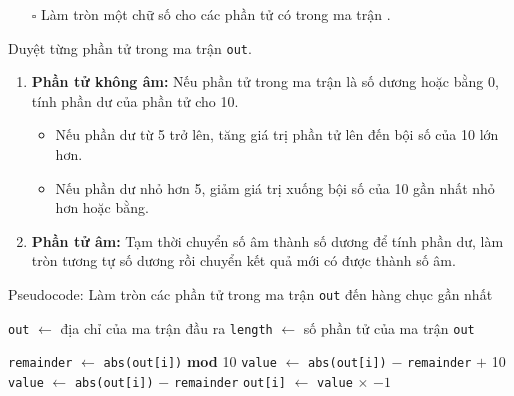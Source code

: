 \documentclass{article}
\begin{document}
\pagebreak
\begin{itemize}
	\item [$\square$] Làm tròn một chữ số cho các phần tử có trong ma trận .
\end{itemize}
\hspace{0.4cm} Duyệt từng phần tử trong ma trận \texttt{out}.
\begin{enumerate}
	\item \textbf{Phần tử không âm:} Nếu phần tử trong ma trận là số dương hoặc bằng 0, tính phần dư của phần tử cho 10.
	\begin{itemize}
		\item Nếu phần dư từ 5 trở lên, tăng giá trị phần tử lên đến bội số của 10 lớn hơn.
		\item Nếu phần dư nhỏ hơn 5, giảm giá trị xuống bội số của 10 gần nhất nhỏ hơn hoặc bằng.
	\end{itemize}
	\item \textbf{Phần tử âm: } Tạm thời chuyển số âm thành số dương để tính phần dư, làm tròn tương tự số dương rồi chuyển kết quả mới có được thành số âm.
\end{enumerate}
\begin{algorithm}
	\caption{Pseudocode: Làm tròn các phần tử trong ma trận \texttt{out} đến hàng chục gần nhất}
	\begin{algorithmic}[1]
		\State \texttt{out} $\gets$ địa chỉ của ma trận đầu ra
		\State \texttt{length} $\gets$ số phần tử của ma trận \texttt{out}
		
		\State \texttt{remainder} $\gets$ \texttt{abs(out[i])} \textbf{mod} 10
		\State \texttt{value} $\gets$ \texttt{abs(out[i])} $-$ \texttt{remainder} $+$ 10
		\Else
		\State \texttt{value} $\gets$ \texttt{abs(out[i])} $-$ \texttt{remainder}
		\EndIf
		\State \texttt{out[i]} $\gets$ \texttt{value} $\times$ $-1$
		\EndIf
		\EndFor
	\end{algorithmic}
\end{algorithm}
\pagebreak
\end{document}
